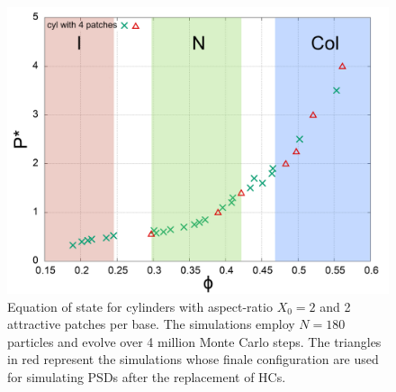 \documentclass[aip,jcp, amsmath, amssymb, reprint]{revtex4-1}
\begin{document}
\begin{figure}[h!]
\includegraphics[width=0.86\linewidth]{eos.png}
\caption{\label{fig:eos1} Equation of state for cylinders with aspect-ratio $X_0=2$ and 2 attractive patches per base. The simulations employ $N = 180$ particles and evolve over 4 million Monte Carlo steps. The triangles in red represent the simulations whose finale configuration are used for simulating PSDs after the replacement of HCs.}
\end{figure}
\end{document}
